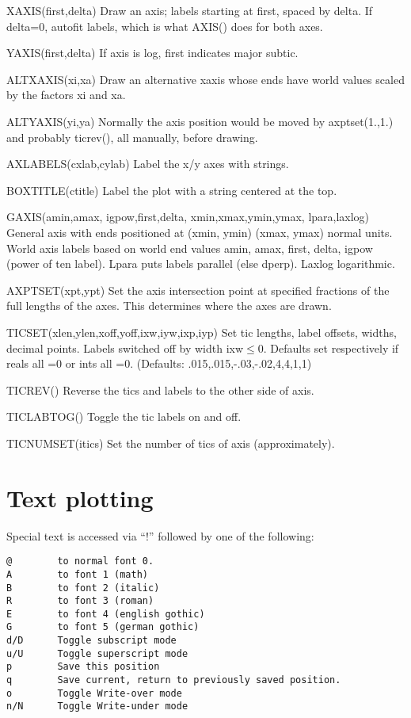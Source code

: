 \documentclass[12pt]{article}
\newif \iftth
\begin{document}
XAXIS(first,delta) Draw an axis; labels starting at first, spaced by delta.
If delta=0, autofit labels, which is what AXIS() does for both axes.

YAXIS(first,delta) If axis is log, first indicates major subtic.

ALTXAXIS(xi,xa) Draw an alternative xaxis whose ends have world values
scaled by the factors xi and xa.

ALTYAXIS(yi,ya) Normally the axis position would be moved by
axptset(1.,1.) and probably ticrev(), all manually, before drawing.

AXLABELS(cxlab,cylab) Label the x/y axes with strings.

BOXTITLE(ctitle) Label the plot with a string centered at the top.

GAXIS(amin,amax, igpow,first,delta, xmin,xmax,ymin,ymax, lpara,laxlog)
General axis with ends positioned at (xmin, ymin) (xmax, ymax) normal
units. World axis labels based on world end values amin, amax, first, delta,
igpow (power of ten label).  Lpara puts labels parallel (else
dperp). Laxlog logarithmic.

AXPTSET(xpt,ypt) Set the axis intersection point at specified fractions of
the full lengths of the axes. This determines where the axes are drawn.

TICSET(xlen,ylen,xoff,yoff,ixw,iyw,ixp,iyp) Set tic lengths, label
offsets, widths, decimal points. Labels switched off by width
ixw$\le$0. Defaults set respectively if reals all =0 or ints all
=0. (Defaults: .015,.015,-.03,-.02,4,4,1,1)

TICREV() Reverse the tics and labels to the other side of axis.

TICLABTOG() Toggle the tic labels on and off.

TICNUMSET(itics) Set the number of tics of axis (approximately).

\section{Text plotting}

\iftth \special{html:<img align="right" src="fontshow.png">} \fi

Special text is accessed via ``!'' followed by one of 
the following:
\begin{verbatim}
@        to normal font 0.
A        to font 1 (math)
B        to font 2 (italic)
R        to font 3 (roman)
E        to font 4 (english gothic)
G        to font 5 (german gothic)
d/D      Toggle subscript mode
u/U      Toggle superscript mode
p        Save this position
q        Save current, return to previously saved position.
o        Toggle Write-over mode
n/N      Toggle Write-under mode
\end{verbatim}
\end{document}
